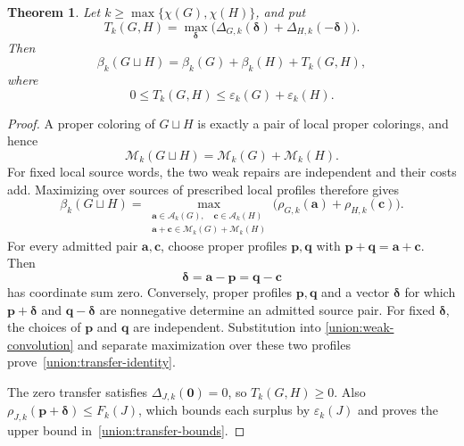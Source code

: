 \documentclass[11pt,reqno]{amsart}
\numberwithin{equation}{section}
\newtheorem{theorem}{Theorem}[section]
\theoremstyle{definition}
\theoremstyle{remark}
\begin{document}
\begin{theorem}\label{union:transfer-theorem}
Let $k\ge\max\{\chi(G),\chi(H)\}$, and put
\[
 T_k(G,H)=\max_{\boldsymbol\delta}
  \bigl(\Delta_{G,k}(\boldsymbol\delta)
       +\Delta_{H,k}(-\boldsymbol\delta)\bigr).
\]
Then
\begin{equation}\label{union:transfer-identity}
 \beta_k(G\sqcup H)=\beta_k(G)+\beta_k(H)+T_k(G,H),
\end{equation}
where
\begin{equation}\label{union:transfer-bounds}
 0\le T_k(G,H)\le\varepsilon_k(G)+\varepsilon_k(H).
\end{equation}
\end{theorem}

\begin{proof}
A proper coloring of $G\sqcup H$ is exactly a pair of local proper
colorings, and hence
\[
 \mathcal M_k(G\sqcup H)=\mathcal M_k(G)+\mathcal M_k(H).
\]
For fixed local source words, the two weak repairs are independent and
their costs add.  Maximizing over sources of prescribed local profiles
therefore gives
\begin{equation}\label{union:weak-convolution}
 \beta_k(G\sqcup H)=
 \max_{\substack{\mathbf a\in\mathcal A_k(G),\quad
                  \mathbf c\in\mathcal A_k(H)\\
         \mathbf a+\mathbf c\in\mathcal M_k(G)+\mathcal M_k(H)}}
  \bigl(\rho_{G,k}(\mathbf a)+\rho_{H,k}(\mathbf c)\bigr).
\end{equation}
For every admitted pair $\mathbf a,\mathbf c$, choose proper profiles
$\mathbf p,\mathbf q$ with
$\mathbf p+\mathbf q=\mathbf a+\mathbf c$.  Then
\[
 \boldsymbol\delta=\mathbf a-\mathbf p
                  =\mathbf q-\mathbf c
\]
has coordinate sum zero.  Conversely, proper profiles
$\mathbf p,\mathbf q$ and a vector $\boldsymbol\delta$ for which
$\mathbf p+\boldsymbol\delta$ and
$\mathbf q-\boldsymbol\delta$ are nonnegative determine an admitted
source pair.  For fixed $\boldsymbol\delta$, the choices of
$\mathbf p$ and $\mathbf q$ are independent.  Substitution into
\eqref{union:weak-convolution} and separate maximization over these
two profiles prove~\eqref{union:transfer-identity}.

The zero transfer satisfies $\Delta_{J,k}(\mathbf0)=0$, so
$T_k(G,H)\ge0$.  Also
$\rho_{J,k}(\mathbf p+\boldsymbol\delta)\le F_k(J)$,
which bounds each surplus by $\varepsilon_k(J)$ and proves the upper
bound in~\eqref{union:transfer-bounds}.
\end{proof}
\end{document}
